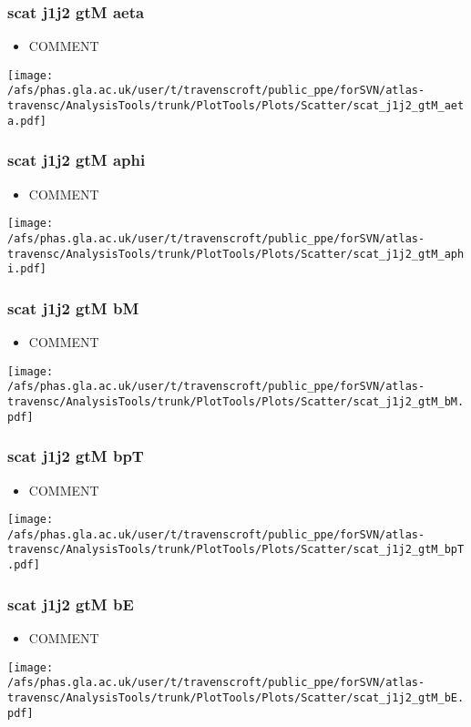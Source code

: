 \documentclass{beamer}
\begin{document}
\begin{frame}
\frametitle{scat j1j2 gtM aeta}
\begin{itemize}
\item COMMENT
\end{itemize}
\begin{center}
\texttt{[image: /afs/phas.gla.ac.uk/user/t/travenscroft/public\_ppe/forSVN/atlas-travensc/AnalysisTools/trunk/PlotTools/Plots/Scatter/scat\_j1j2\_gtM\_aeta.pdf]}
\end{center}
\end{frame}

\begin{frame}
\frametitle{scat j1j2 gtM aphi}
\begin{itemize}
\item COMMENT
\end{itemize}
\begin{center}
\texttt{[image: /afs/phas.gla.ac.uk/user/t/travenscroft/public\_ppe/forSVN/atlas-travensc/AnalysisTools/trunk/PlotTools/Plots/Scatter/scat\_j1j2\_gtM\_aphi.pdf]}
\end{center}
\end{frame}

\begin{frame}
\frametitle{scat j1j2 gtM bM}
\begin{itemize}
\item COMMENT
\end{itemize}
\begin{center}
\texttt{[image: /afs/phas.gla.ac.uk/user/t/travenscroft/public\_ppe/forSVN/atlas-travensc/AnalysisTools/trunk/PlotTools/Plots/Scatter/scat\_j1j2\_gtM\_bM.pdf]}
\end{center}
\end{frame}

\begin{frame}
\frametitle{scat j1j2 gtM bpT}
\begin{itemize}
\item COMMENT
\end{itemize}
\begin{center}
\texttt{[image: /afs/phas.gla.ac.uk/user/t/travenscroft/public\_ppe/forSVN/atlas-travensc/AnalysisTools/trunk/PlotTools/Plots/Scatter/scat\_j1j2\_gtM\_bpT.pdf]}
\end{center}
\end{frame}

\begin{frame}
\frametitle{scat j1j2 gtM bE}
\begin{itemize}
\item COMMENT
\end{itemize}
\begin{center}
\texttt{[image: /afs/phas.gla.ac.uk/user/t/travenscroft/public\_ppe/forSVN/atlas-travensc/AnalysisTools/trunk/PlotTools/Plots/Scatter/scat\_j1j2\_gtM\_bE.pdf]}
\end{center}
\end{frame}
\end{document}
